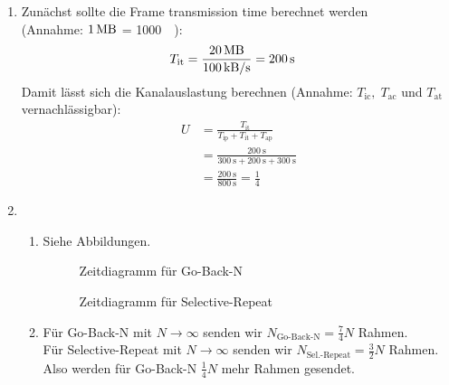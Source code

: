 \documentclass[12pt]{scrartcl}
\begin{document}
    \begin{enumerate}[label=(\alph*)]
        \item Zunächst sollte die Frame transmission time berechnet werden\\ (Annahme: $\SI{1}{\mega\byte}$ = \SI{1000}{\kilo\byte}): 
        \begin{align*}
            T_\text{it} &= \frac{\SI{20}{\mega\byte}}{\SI{100}{\kilo\byte/\second}} = \SI{200}{\second}
        \end{align*}
        Damit lässt sich die Kanalauslastung berechnen (Annahme: $T_\text{ic}, \; T_\text{ac}$ und $T_\text{at}$ vernachlässigbar):
        \begin{align*}
            U &= \frac{T_\text{it}}{T_\text{ip} + T_\text{it} + T_\text{ap}}\\
            &= \frac{\SI{200}\second}{\SI{300}\second + \SI{200}\second + \SI{300}\second}\\
            &= \frac{\SI{200}\second}{\SI{800}\second} = \frac{1}{4}
        \end{align*}
        \item \begin{enumerate}[label=(\roman*)]
            \item Siehe Abbildungen.
            \begin{figure}[h]
                \caption{Zeitdiagramm für Go-Back-N}
            \end{figure}               
            \begin{figure}[h]
                \caption{Zeitdiagramm für Selective-Repeat}
            \end{figure}                
            \item Für Go-Back-N mit $N\rightarrow \infty$ senden wir $N_\text{Go-Back-N} = \frac{7}{4} N$ Rahmen.\\
            Für Selective-Repeat mit $N\rightarrow \infty$ senden wir $N_\text{Sel.-Repeat} = \frac{3}{2} N$ Rahmen.\\
            Also werden für Go-Back-N $\frac{1}{4} N$ mehr Rahmen gesendet.
        \end{enumerate}
    \end{enumerate}

\end{document}

